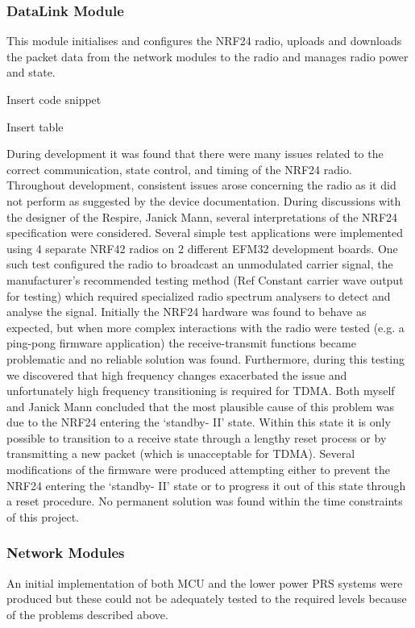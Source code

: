 \subsubsection{DataLink Module}
This module initialises and configures the NRF24 radio, uploads and downloads the packet data from
the network modules to the radio and manages radio power and state.


Insert code snippet


Insert table


During development it was found that there were many issues related to the correct
communication, state control, and timing of the NRF24 radio. Throughout development, consistent
issues arose concerning the radio as it did not perform as suggested by the device documentation.
During discussions with the designer of the Respire, Janick Mann, several interpretations of the
NRF24 specification were considered. Several simple test applications were implemented using 4
separate NRF42 radios on 2 different EFM32 development boards. One such test configured the
radio to broadcast an unmodulated carrier signal, the manufacturer’s recommended testing method
(Ref Constant carrier wave output for testing) which required specialized radio spectrum analysers
to detect and analyse the signal. Initially the NRF24 hardware was found to behave as expected, but
when more complex interactions with the radio were tested (e.g. a ping-pong firmware application)
the receive-transmit functions became problematic and no reliable solution was found.
Furthermore, during this testing we discovered that high frequency changes exacerbated the issue
and unfortunately high frequency transitioning is required for TDMA. Both myself and Janick Mann
concluded that the most plausible cause of this problem was due to the NRF24 entering the
‘standby- II’ state. Within this state it is only possible to transition to a receive state through a
lengthy reset process or by transmitting a new packet (which is unacceptable for TDMA). Several
modifications of the firmware were produced attempting either to prevent the NRF24 entering the
‘standby- II’ state or to progress it out of this state through a reset procedure. No permanent
solution was found within the time constraints of this project.


\subsubsection{Network Modules}
An initial implementation of both MCU and the lower power PRS systems were produced but these
could not be adequately tested to the required levels because of the problems described above.


